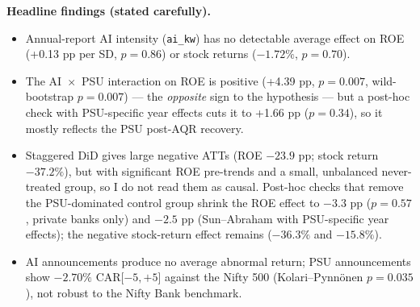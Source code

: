 \documentclass[10.5pt,a4paper]{article}
\newcommand{\var}[1]{\texttt{#1}}
\begin{document}
\textbf{Headline findings (stated carefully).}
\begin{itemize}
\item Annual-report AI intensity (\var{ai\_kw}) has no detectable average effect on ROE (+0.13 pp per SD, $p=0.86$) or
  stock returns ($-1.72\%$, $p=0.70$).
\item The AI~$\times$~PSU interaction on ROE is positive (+4.39 pp, $p=0.007$, wild-bootstrap $p=0.007$) --- the
  \emph{opposite} sign to the hypothesis --- but a post-hoc check with PSU-specific year effects cuts it to +1.66 pp
  ($p=0.34$), so it mostly reflects the PSU post-AQR recovery.
\item Staggered DiD gives large negative ATTs (ROE $-23.9$ pp; stock return $-37.2\%$), but with significant ROE
  pre-trends and a small, unbalanced never-treated group, so I do not read them as causal. Post-hoc checks that remove
  the PSU-dominated control group shrink the ROE effect to $-3.3$ pp ($p=0.57$, private banks only) and $-2.5$ pp
  (Sun--Abraham with PSU-specific year effects); the negative stock-return effect remains ($-36.3\%$ and $-15.8\%$).
\item AI announcements produce no average abnormal return; PSU announcements show $-2.70\%$ CAR[$-5,+5$] against the
  Nifty 500 (Kolari--Pynn\"onen $p=0.035$), not robust to the Nifty Bank benchmark.
\end{itemize}
\end{document}
